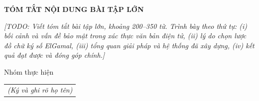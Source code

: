 \documentclass[../DoAn.tex]{subfiles}
\begin{document}
\begin{center}
    \Large{\textbf{TÓM TẮT NỘI DUNG BÀI TẬP LỚN}}\\
\end{center}
\vspace{1cm}

\textit{[TODO: Viết tóm tắt bài tập lớn, khoảng 200--350 từ. Trình bày theo thứ tự: (i) bối cảnh và vấn đề bảo mật trong xác thực văn bản điện tử, (ii) lý do chọn lược đồ chữ ký số ElGamal, (iii) tổng quan giải pháp và hệ thống đã xây dựng, (iv) kết quả đạt được và đóng góp chính.]}

\begin{flushright}
Nhóm thực hiện\\
\begin{tabular}{@{}c@{}}
\textit{(Ký và ghi rõ họ tên)}
\end{tabular}
\end{flushright}
\end{document}
